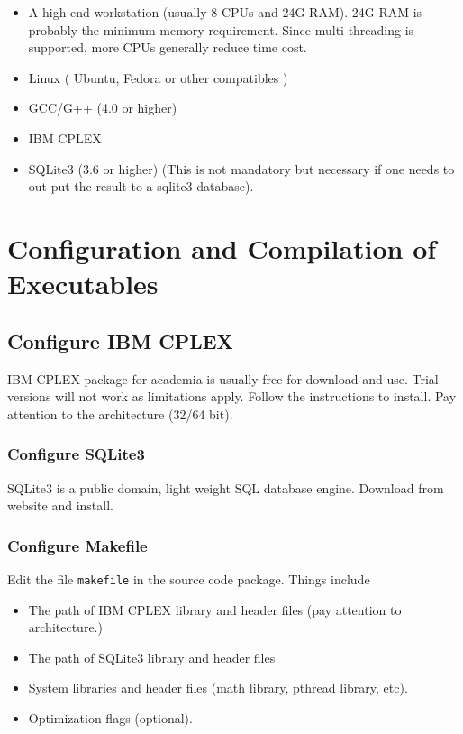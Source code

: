 \documentclass{article}
\begin{document}
\begin{itemize}

\item A high-end workstation (usually 8 CPUs and 
24G RAM). 24G RAM is probably the minimum memory 
requirement. Since multi-threading is supported, 
more CPUs generally reduce time cost.

\item Linux ( Ubuntu, Fedora or other compatibles )

\item GCC/G++ (4.0 or higher)

\item IBM CPLEX

\item SQLite3 (3.6 or higher) (This is not mandatory 
but necessary if one needs to out put the result to
a sqlite3 database).

\end{itemize}


\section{Configuration and Compilation of Executables}

\subsection{Configure IBM CPLEX}

IBM CPLEX package for academia is usually free for download 
and use. Trial versions will not work as limitations apply. 
Follow the instructions to install. Pay attention to the 
architecture (32/64 bit).


\subsubsection{Configure SQLite3}

SQLite3 is a public domain, light weight SQL database engine. 
Download from website and install.


\subsubsection{Configure Makefile}

Edit the file \texttt{makefile} in the source code package. 
Things include

\begin{itemize}

\item The path of IBM CPLEX library and header files 
(pay attention to architecture.)

\item The path of SQLite3 library and header files

\item System libraries and header files (math library, 
pthread library, etc).

\item Optimization flags (optional).

\end{itemize}
\end{document}

